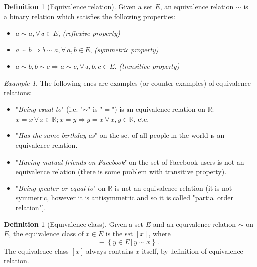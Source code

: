 \documentclass[a4paper,11pt,titlepage, article, oneside]{memoir}
\numberwithin{equation}{section}
\theoremstyle{definition}
\newtheorem{definition}[theorem]{Definition}
\theoremstyle{remark}
\newtheorem{example}[theorem]{Example}
\newcommand{\rfield}{\mathbb{R}}
\begin{document}
\begin{definition}[Equivalence relation]
  Given a set $E$, an equivalence relation $\sim$ is a binary relation which satisfies the following properties:
  \begin{itemize}
    \item $a \sim a, \forall\, a \in E$, \hspace*{\fill}\textit{(reflexive property)}
    \item $a \sim b \Rightarrow b \sim a, \forall\, a, b \in E$, \hspace*{\fill}\textit{(symmetric property)}
    \item $a \sim b, b \sim c \Rightarrow a \sim c, \forall \, a, b, c \in E$. \hspace*{\fill}\textit{(transitive property)}
  \end{itemize}
\end{definition}

\begin{tcolorbox}\begin{example}
  The following ones are examples (or counter-examples) of equivalence relations:
  \begin{itemize}
  \item "\textit{Being equal to}" (i.e. "$\sim$" is "$=$") is an equivalence relation on $\rfield$: $x=x \, \forall\, x \in \rfield; x=y \Rightarrow y=x \, \forall\, x, y \in \rfield$, etc.
  \item "\textit{Has the same birthday as}" on the set of all people in the world is an equivalence relation.
  \item "\textit{Having mutual friends on Facebook}" on the set of Facebook users is not an equivalence relation (there is some problem with transitive property).
  \item "\textit{Being greater or equal to}" on $\rfield$ is not an equivalence relation (it is not symmetric, however it is antisymmetric and so it is called "partial order relation").
\end{itemize}
\end{example}\end{tcolorbox}

\begin{definition}[Equivalence class]
  Given a set $E$ and an equivalence relation $\sim$ on $E$, the equivalence class of $x \in E$ is the set $[x]$, where
  \begin{equation}
    [x] \equiv \left \{ y \in E \,|\, y \sim x \right \} \, .
  \end{equation}
  The equivalence class $[x]$ always contains $x$ itself, by definition of equivalence relation.
\end{definition}
\end{document}
